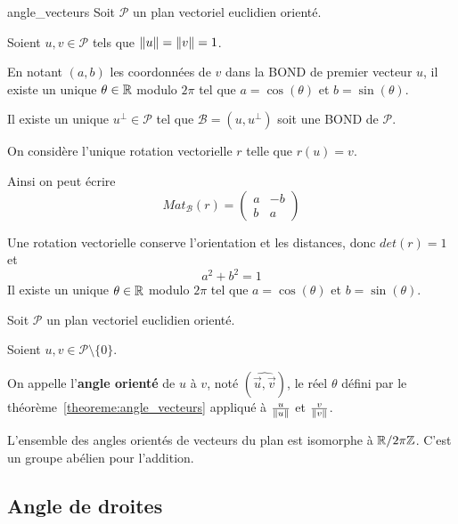 \documentclass[a4paper, 12pt]{article}
\begin{document}
\begin{theoreme}{}{angle_vecteurs}
    Soit $\mathcal{P}$ un plan vectoriel euclidien orienté.

    Soient $u, v \in \mathcal{P}$ tels que $\left\lVert u\right\rVert = \left\lVert v\right\rVert = 1$.

    \vspace{1cm}
    En notant $(a, b)$ les coordonnées de $v$ dans la BOND de premier vecteur $u$,
    il existe un unique $\theta \in \mathbb{R}$ modulo $2\pi$ tel que $a = \cos(\theta)$ et $b = \sin(\theta)$.
\end{theoreme}

\begin{demonstration}
    Il existe un unique $u^\perp \in \mathcal{P}$ tel que $\mathcal{B} = (u, u^\perp)$ soit une BOND de $\mathcal{P}$.

    On considère l'unique rotation vectorielle $r$ telle que $r(u) = v$.

    Ainsi on peut écrire
    $$
    Mat_{\mathcal{B}}(r) = \begin{pmatrix}
        a & -b \\
        b & a
    \end{pmatrix}
    $$

    Une rotation vectorielle conserve l'orientation et les distances, donc $det(r) = 1$ et
    $$
    a^2 + b^2 = 1
    $$
    Il existe un unique $\theta \in \mathbb{R}$ modulo $2\pi$ tel que $a = \cos(\theta)$ et $b = \sin(\theta)$.
\end{demonstration}

\begin{definition}
    Soit $\mathcal{P}$ un plan vectoriel euclidien orienté.

    Soient $u, v \in \mathcal{P}\setminus\{0\}$.

    On appelle l'\textbf{angle orienté} de $u$ à $v$, noté $(\widehat{\overrightarrow{u}, \overrightarrow{v}})$,
    le réel $\theta$ défini par le théorème~\ref{theoreme:angle_vecteurs} appliqué à $\frac{u}{\left\lVert u\right\rVert}$ et $\frac{v}{\left\lVert v\right\rVert}$.
\end{definition}

\begin{remarque}
    L'ensemble des angles orientés de vecteurs du plan est isomorphe à $\mathbb{R} / 2\pi\mathbb{Z}$.
    C'est un groupe abélien pour l'addition.
\end{remarque}

\subsection{Angle de droites}
\end{document}
